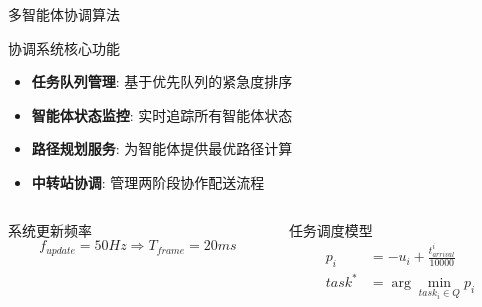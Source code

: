 \documentclass[
10pt,
aspectratio=169,
]{beamer}
\begin{document}
\begin{frame}{多智能体协调算法}
    \begin{block}{协调系统核心功能}
        \begin{itemize}
            \item \textbf{任务队列管理}: 基于优先队列的紧急度排序
            \item \textbf{智能体状态监控}: 实时追踪所有智能体状态
            \item \textbf{路径规划服务}: 为智能体提供最优路径计算
            \item \textbf{中转站协调}: 管理两阶段协作配送流程
        \end{itemize}
    \end{block}
    
    \begin{columns}
        \begin{column}{0.5\textwidth}
            \begin{alertblock}{系统更新频率}
                \begin{equation}
                f_{update} = 50 Hz \Rightarrow T_{frame} = 20 ms
                \end{equation}
            \end{alertblock}
        \end{column}
        \begin{column}{0.5\textwidth}
            \begin{exampleblock}{任务调度模型}
                \begin{align}
                p_i &= -u_i + \frac{t_{arrival}^i}{10000} \\
                task^* &= \arg\min_{task_i \in Q} p_i
                \end{align}
            \end{exampleblock}
        \end{column}
    \end{columns}
\end{frame}
\end{document}
